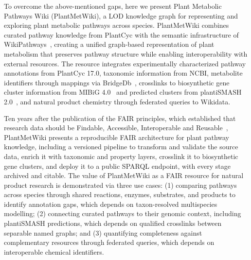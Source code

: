 \documentclass[11pt,a4paper]{article}
\begin{document}
To overcome the above-mentioned gaps, here we present Plant Metabolic Pathways Wiki (PlantMetWiki), a
LOD knowledge graph for representing and exploring plant metabolic pathways across species.
PlantMetWiki combines curated pathway knowledge from PlantCyc with the semantic infrastructure of
WikiPathways~\cite{agrawal2024}, creating a unified graph-based representation of plant metabolism
that preserves pathway structure while enabling interoperability with external resources. The
resource integrates experimentally characterized pathway annotations from PlantCyc 17.0, taxonomic
information from NCBI, metabolite identifiers through mappings via
BridgeDb~\cite{slenter2018,vaniersel2010}, crosslinks to biosynthetic gene cluster information from
MIBiG 4.0~\cite{zdouc2025} and predicted clusters from plantiSMASH 2.0~\cite{delpup2026}, and natural
product chemistry through federated queries to Wikidata.

Ten years after the publication of the FAIR principles, which established that research data
should be Findable, Accessible, Interoperable and Reusable~\cite{wilkinson2016}, PlantMetWiki presents
a reproducible FAIR architecture for plant pathway knowledge, including a versioned pipeline to transform and
validate the source data, enrich it with taxonomic and property layers, crosslink it to biosynthetic gene clusters, and deploy it to a
public SPARQL endpoint, with every stage archived and citable.
The value of PlantMetWiki as a FAIR resource for natural product research is demonstrated via three use cases: (1) comparing pathways across species through shared reactions, enzymes, substrates,
and products to identify annotation gaps, which depends on taxon-resolved multispecies modelling;
(2) connecting curated pathways to their genomic context, including plantiSMASH predictions, which
depends on qualified crosslinks between separable named graphs; and (3) quantifying completeness
against complementary resources through federated queries, which depends on interoperable chemical
identifiers.

\end{document}
